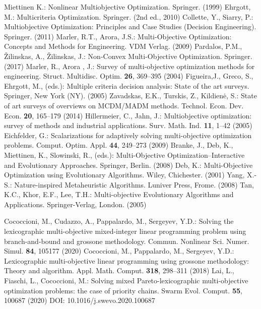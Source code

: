 \documentclass[smallextended]{svjour3}       %
\begin{document}
\begin{thebibliography}{}
%
%

 Miettinen K.: Nonlinear Multiobjective Optimization. Springer. (1999)
 Ehrgott, M.: Multicriteria Optimization. Springer. (2nd ed., 2010)
 Collette, Y., Siarry, P.: Multiobjective Optimization: Principles and Case Studies (Decision Engineering). Springer. (2011)
 Marler, R.T., Arora, J.S.: Multi-Objective Optimization: Concepts and Methods for Engineering. VDM Verlag. (2009)
 Pardalos, P.M., {\v Z}ilinskas, A., {\v Z}ilinskas, J.: Non-Convex Multi-Objective Optimization. Springer. (2017)
 Marler, R., Arora , J.: Survey of multi-objective optimization methods for engineering. Struct. Multidisc. Optim. \textbf{26}, 369--395 (2004)
 Figueira,J., Greco, S., Ehrgott, M., (eds.): Multiple criteria decision analysis: State of the art surveys. Springer, New York (NY). (2005)
 Zavadskas, E.K., Turskis, Z., Kildien\.e, S.: State of art surveys of overviews on MCDM/MADM methods. Technol. Econ. Dev. Econ. \textbf{20}, 165--179 (2014)
 Hillermeier, C., Jahn, J.: Multiobjective optimization: survey of methods and industrial applications. Surv. Math. Ind. \textbf{11}, 1--42 (2005)
 Eichfelder, G.: Scalarizations for adaptively solving multi-objective optimization problems. Comput. Optim. Appl. \textbf{44}, 249--273 (2009)
 Branke, J., Deb, K., Miettinen, K., Slowinski, R., (eds.): Multi-Objective Optimization--Interactive and Evolutionary Approaches. Springer, Berlin. (2008)
 Deb, K.: Multi-Objective Optimization using Evolutionary Algorithms. Wiley, Chichester. (2001)
 Yang, X.-S.: Nature-inspired Metaheuristic Algorithms. Luniver Press, Frome. (2008) 
 Tan, K.C., Khor, E.F., Lee, T.H.: Multi-objective Evolutionary Algorithms and Applications. Springer-Verlag, London. (2005)

 Cococcioni, M., Cudazzo, A., Pappalardo, M., Sergeyev, Y.D.: Solving the lexicographic multi-objective mixed-integer linear programming problem using branch-and-bound and grossone methodology. Commun. Nonlinear Sci. Numer. Simul. \textbf{84}, 105177 (2020)
 Cococcioni, M., Pappalardo, M., Sergeyev, Y.D.: Lexicographic multi-objective linear programming using grossone methodology: Theory and algorithm. Appl. Math. Comput. \textbf{318}, 298--311 (2018)
 Lai, L., Fiaschi, L., Cococcioni, M.: Solving mixed Pareto-lexicographic multi-objective optimization problems: the case of priority chains. Swarm Evol. Comput. \textbf{55}, 100687 (2020) DOI: 10.1016/j.swevo.2020.100687


\end{thebibliography}
\end{document}
